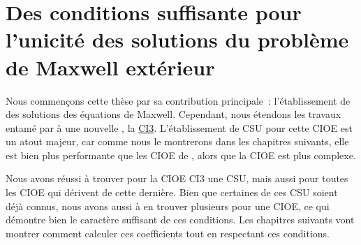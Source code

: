\chapter[Des CSU des solutions du problème de Maxwell extérieur]{Des conditions suffisante pour l'unicité des solutions du problème de Maxwell extérieur}
\label{sec:csu}
\minitoc
\newpage
{}
Nous commençons cette thèse par sa contribution principale : l'établissement de  des solutions des équations de Maxwell.
Cependant, nous étendons les travaux entamé par \cite{stupfel_sufficient_2011} à une nouvelle , la \hyperlink{ci3}{CI3}. L'établissement de CSU pour cette CIOE est un atout majeur, car comme nous le montrerons dans les chapitres suivants, elle est bien plus performante que les CIOE de \cite{stupfel_sufficient_2011}, alors que la CIOE est plus complexe.



Nous avons réussi à trouver pour la CIOE CI3 une CSU, mais aussi pour toutes les CIOE qui dérivent de cette dernière. Bien que certaines de ces CSU soient déjà connus, nous avons aussi à en trouver plusieurs pour une CIOE, ce qui démontre bien le caractère suffisant de ces conditions. Les chapitres suivants vont montrer comment calculer ces coefficients tout en respectant ces conditions.